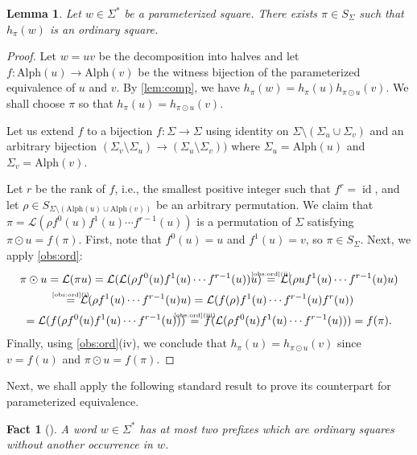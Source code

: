 \documentclass{article}
\theoremstyle{plain}
\newtheorem{lemma}[theorem]{Lemma}
\newtheorem{fact}[theorem]{Fact}
\theoremstyle{definition}
\theoremstyle{remark}
\renewcommand{\Alph}{\mathrm{Alph}}
\renewcommand{\L}{\mathcal{L}}
\DeclareMathOperator{\id}{id}
\begin{document}
\begin{lemma}\label{lem:pi}
Let $w\in \Sigma^*$ be a parameterized square. There exists $\pi \in S_\Sigma$ such that $h_{\pi}(w)$
is an ordinary square. 
\end{lemma}
\begin{proof}
Let $w=uv$ be the decomposition into halves and let $f:\Alph(u)\to \Alph(v)$ be the witness bijection
of the parameterized equivalence of $u$ and $v$.
By \cref{lem:comp}, we have $h_{\pi}(w)=h_{\pi}(u)h_{\pi \odot u}(v)$.
We shall choose $\pi$ so that $h_{\pi}(u)=h_{\pi \odot u}(v)$. 

Let us extend $f$ to a bijection
$f : \Sigma \to \Sigma$ using identity on $\Sigma\setminus (\Sigma_u\cup \Sigma_v)$ and
an arbitrary bijection $(\Sigma_v \setminus \Sigma_u)\to (\Sigma_u\setminus \Sigma_v))$
where $\Sigma_u = \Alph(u)$ and $\Sigma_v=\Alph(v)$.

Let $r$ be the rank of $f$, i.e., the smallest positive integer such that $f^r = \id$,
and let $\rho\in S_{\Sigma\setminus (\Alph(u)\cup \Alph(v))}$ be an arbitrary permutation.
We claim that $\pi = \L(\rho f^{0}(u)f^{1}(u)\cdots f^{r-1}(u))$ is a permutation of $\Sigma$ satisfying $\pi \odot u = f(\pi)$.
First, note that $f^0(u)=u$ and $f^1(u)=v$, so $\pi\in S_{\Sigma}$.
Next, we apply \cref{obs:ord}:
\begin{multline*}
  \pi \odot u = \L(\pi u) = \L(\L(\rho f^{0}(u)f^{1}(u)\cdots f^{r-1}(u))u)
               \,\stackrel{\mathclap{\mbox{\tiny\ref{obs:ord}(ii)}}}{=}\, \L(\rho uf^{1}(u)\cdots f^{r-1}(u)u)\\
               \,\stackrel{\mathclap{\mbox{\tiny\ref{obs:ord}(i)}}}{=}\, \L(\rho f^{1}(u)\cdots f^{r-1}(u)u)
               = \L(f(\rho) f^{1}(u)\cdots f^{r-1}(u)f^r(u))\\
               = \L(f(\rho f^{0}(u)f^{1}(u)\cdots f^{r-1}(u)))
               \,\stackrel{\mathclap{\mbox{\tiny\ref{obs:ord}(iii)}}}{=}\, f(\L(\rho f^{0}(u)f^{1}(u)\cdots f^{r-1}(u)))
               = f(\pi).
\end{multline*}
Finally, using \cref{obs:ord}(iv), we conclude that $h_{\pi}(u)=h_{\pi \odot u}(v)$ since $v=f(u)$ and $\pi \odot u = f(\pi)$.
\end{proof}
 
 Next, we shall apply the following standard result to prove its counterpart for parameterized equivalence.
  \begin{fact}[\cite{fraenkel-simpson}]\label{fct:fraenkel}
  A word $w\in \Sigma^*$ has at most two prefixes which are ordinary squares without another occurrence in $w$.
  \end{fact}
  
\end{document}
